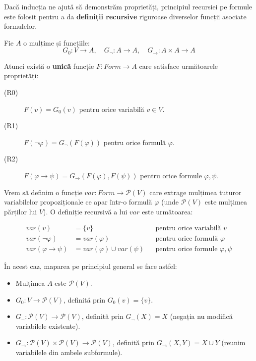 Dacă inducția ne ajută să demonstrăm proprietăți, principiul recursiei pe formule este folosit pentru a da \textbf{definiții recursive} riguroase diverselor funcții asociate formulelor.

\begin{prop}

	Fie $A$ o mulțime și funcțiile:
	$$G_0 : V \to A, \quad G_\neg : A \to A, \quad G_\to : A \times A \to A$$

	Atunci există o \textbf{unică} funcție $F : Form \to A$ care satisface următoarele proprietăți:

	\begin{description}
		\item[(R0)] $F(v) = G_0(v)$ pentru orice variabilă $v \in V$.
		\item[(R1)] $F(\neg \varphi) = G_\neg(F(\varphi))$ pentru orice formulă $\varphi$.
		\item[(R2)] $F(\varphi \to \psi) = G_\to(F(\varphi), F(\psi))$ pentru orice formule $\varphi, \psi$.
	\end{description}

\end{prop}

\begin{eg}
	Vrem să definim o funcție $var : Form \to \mathcal{P}(V)$ care extrage mulțimea tuturor variabilelor propoziționale ce apar într-o formulă $\varphi$ (unde $\mathcal{P}(V)$ este mulțimea părților lui $V$). O definiție recursivă a lui $var$ este următoarea:

	$$
		\begin{aligned}
			var(v)                & = \{v\}                       &  & \text{pentru orice variabilă } v           \\
			var(\neg \varphi)     & = var(\varphi)                &  & \text{pentru orice formulă } \varphi       \\
			var(\varphi \to \psi) & = var(\varphi) \cup var(\psi) &  & \text{pentru orice formule } \varphi, \psi
		\end{aligned}
	$$

	În acest caz, maparea pe principiul general se face astfel:
	\begin{itemize}
		\item Mulțimea $A$ este $\mathcal{P}(V)$.
		\item $G_0 : V \to \mathcal{P}(V)$, definită prin $G_0(v) = \{v\}$.
		\item $G_\neg : \mathcal{P}(V) \to \mathcal{P}(V)$, definită prin $G_\neg(X) = X$ (negația nu modifică variabilele existente).
		\item $G_\to : \mathcal{P}(V) \times \mathcal{P}(V) \to \mathcal{P}(V)$, definită prin $G_\to(X, Y) = X \cup Y$ (reunim variabilele din ambele subformule).
	\end{itemize}

\end{eg}

